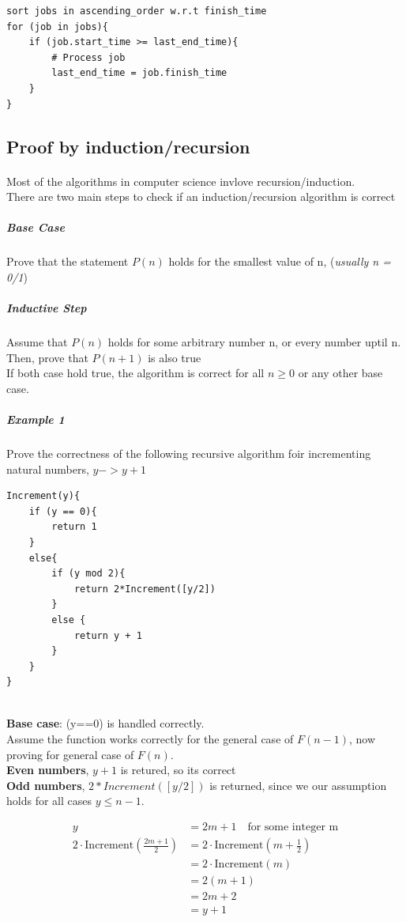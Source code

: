 \documentclass{article}
\begin{document}
\begin{lstlisting}
sort jobs in ascending_order w.r.t finish_time
for (job in jobs){
	if (job.start_time >= last_end_time){
		# Process job 
		last_end_time = job.finish_time
	}
}
\end{lstlisting}

\subsection{Proof by induction/recursion}
\paragraph{}
Most of the algorithms in computer science invlove recursion/induction.
\\
There are two main steps to check if an induction/recursion algorithm is correct
\subparagraph{Base Case}
Prove that the statement $P(n)$ holds for the smallest value of n, (\textit{usually n = 0/1})
\subparagraph{Inductive Step}
Assume that $P(n)$ holds for some arbitrary number n, or every number uptil n. Then, prove that $P(n+1)$ is also true
\\
If both case hold true, the algorithm is correct for all $n \geq 0$ or any other base case.

\subparagraph{Example 1}
Prove the correctness of the following recursive algorithm foir incrementing natural numbers, $y -> y+1$

\begin{lstlisting}
Increment(y){
	if (y == 0){
		return 1
	}
	else{
		if (y mod 2){
			return 2*Increment([y/2])
		}
		else {
			return y + 1
		}
	}
}
\end{lstlisting}
\\
\textbf{Base case}: (y==0) is handled correctly.
\\
Assume the function works correctly for the general case of $F(n-1)$, now proving for general case of $F(n)$.
\\
\textbf{Even numbers}, $y+1$ is retured, so its correct
\\
\textbf{Odd numbers}, $2*Increment([y/2])$ is returned, since we our assumption holds for all cases $y \leq n-1$.

\begin{align*}
	y &= 2m + 1 \quad \text{for some integer m}\\
	2 \cdot \text{Increment} \left(\frac{2m+1}{2}\right) &= 2 \cdot \text{Increment}\left(m + \frac{1}{2}\right)\\
																											 &= 2 \cdot \text{Increment}(m)\\
																											 &= 2(m+1)\\
																											 &= 2m+2\\
																											 &= y+1
\end{align*}
\end{document}
